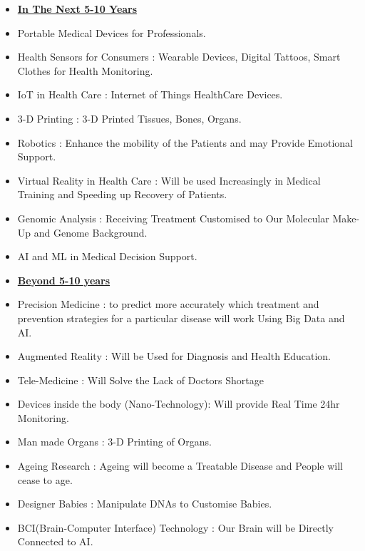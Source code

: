 \documentclass[12pt]{article}
\begin{document}
\begin{itemize}
\large
 \item[\ding{110}]\textbf{\underline{In The Next 5-10 Years}}
\normalsize
 \item[\ding{234}] Portable Medical Devices for Professionals.
 
 \item[\ding{234}] Health Sensors for Consumers : Wearable Devices, Digital Tattoos, Smart Clothes for Health Monitoring.
 
 \item[\ding{234}] IoT in Health Care : Internet of Things HealthCare Devices.
 
 \item[\ding{234}] 3-D Printing : 3-D Printed Tissues, Bones, Organs.
 
 \item[\ding{234}] Robotics : Enhance the mobility of the Patients and may Provide Emotional Support.
 
 \item[\ding{234}] Virtual Reality in Health Care : Will be used Increasingly in Medical Training and Speeding up Recovery of Patients.
 
 \item[\ding{234}] Genomic Analysis : Receiving Treatment Customised to Our Molecular Make-Up and Genome Background.
 
 \item[\ding{234}] AI and ML in Medical Decision Support.
 
\vspace{5mm}
\large
\item[\ding{110}]\textbf{\underline{Beyond 5-10 years}}
\normalsize
\item Precision Medicine : to predict more accurately which treatment and prevention strategies for a particular disease will work Using Big Data and AI.

\item Augmented Reality : Will be Used for Diagnosis and Health Education.

\item Tele-Medicine : Will Solve  the Lack of Doctors Shortage
\item Devices inside the body (Nano-Technology): Will provide Real Time 24hr Monitoring.

\item Man made Organs : 3-D Printing of Organs.

\item Ageing Research : Ageing will become a Treatable Disease and People will cease to age.

\item Designer Babies : Manipulate DNAs to Customise Babies.

\item BCI(Brain-Computer Interface) Technology : Our Brain will be Directly Connected to AI.

\end{itemize}
\end{document}
